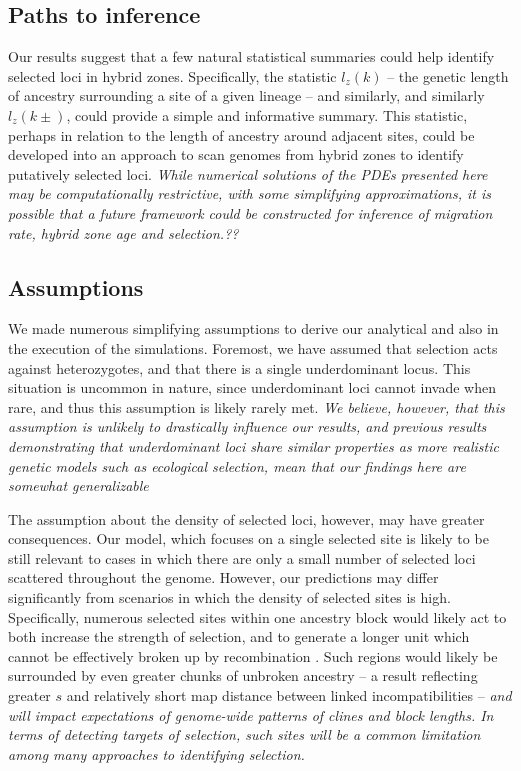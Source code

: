 \documentclass[11pt,letterpaper]{article}
\newcommand{\alisa}[1]{{\em \color{red} #1}}
\begin{document}
\subsection*{Paths to inference}
Our results suggest that a few natural statistical summaries could help identify selected loci in hybrid zones. 
Specifically, the statistic $l_z(k)$ -- the genetic length of ancestry surrounding a site of a given lineage -- and similarly,  and similarly $l_z(k\pm)$, could provide a simple and informative summary. 
This statistic, perhaps in relation to the length of ancestry around adjacent sites, could be developed into an approach to scan genomes from hybrid zones to identify putatively selected loci. \alisa{While numerical solutions of the PDEs presented here may be computationally restrictive, with some simplifying approximations, it is possible that a future framework could be constructed for inference of migration rate, hybrid zone age and selection.??}

\subsection*{Assumptions}
We made numerous simplifying assumptions to derive our analytical and also in the execution of the simulations. %
Foremost, we have assumed that selection acts against heterozygotes, and that there is a single underdominant locus. This situation is uncommon in nature, since underdominant loci cannot invade when rare, and thus this assumption is likely rarely met. \alisa{We believe, however, that this assumption is unlikely to drastically influence our results, and previous results demonstrating that underdominant loci share similar properties as more realistic genetic models such as ecological selection, mean that our findings here are somewhat generalizable} \citep{Barton1989, Barton1993}

The assumption about the density of selected loci, however, may have greater consequences. Our model, which focuses on a single selected site is likely to be still relevant to cases in which there are only a small number of selected loci scattered throughout the genome. However, our predictions may differ significantly from scenarios in which the density of selected sites is high. Specifically, numerous selected sites within one ancestry block would likely act to both  increase the strength of selection, and to generate a longer unit which cannot be effectively broken up by recombination   \citep{Barton1983,Kruuk1999}. Such regions would likely be surrounded by even greater chunks of unbroken ancestry -- a result reflecting  greater $s$ and relatively short map distance between linked incompatibilities -- \alisa{and will impact expectations of genome-wide patterns of clines and block lengths. In terms of detecting targets of selection, such sites will be a common limitation among many approaches to identifying selection.}
\end{document}
